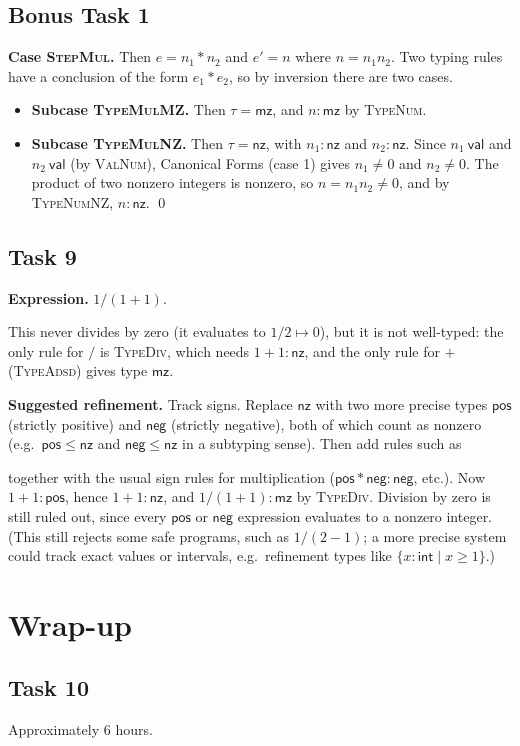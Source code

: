 \documentclass[11pt]{article}
\newcommand{\val}{\ \mathsf{val}}
\newcommand{\step}{\mapsto}
\newcommand{\kw}[1]{\mathsf{#1}}
\newcommand{\tint}{\kw{int}}
\newcommand{\nz}{\kw{nz}}
\newcommand{\mz}{\kw{mz}}
\newcommand{\rn}[1]{\textsc{#1}}
\newenvironment{task}[1]{\subsection*{#1}}{}
\begin{document}
\begin{task}{Bonus Task 1}
\textbf{Case \rn{StepMul}.} Then $e = n_1 * n_2$ and $e' = n$ where $n = n_1 n_2$.
Two typing rules have a conclusion of the form $e_1 * e_2$, so by inversion there are two cases.
\begin{itemize}[leftmargin=*]
\item \textbf{Subcase \rn{TypeMulMZ}.} Then $\tau = \mz$, and $n : \mz$ by \rn{TypeNum}.
\item \textbf{Subcase \rn{TypeMulNZ}.} Then $\tau = \nz$, with $n_1 : \nz$ and $n_2 : \nz$.
  Since $n_1 \val$ and $n_2 \val$ (by \rn{ValNum}), Canonical Forms (case 1) gives
  $n_1 \neq 0$ and $n_2 \neq 0$. The product of two nonzero integers is nonzero, so
  $n = n_1 n_2 \neq 0$, and by \rn{TypeNumNZ}, $n : \nz$. \qed
\end{itemize}
\end{task}

\begin{task}{Task 9}
\textbf{Expression.} $1 / (1 + 1)$.

This never divides by zero (it evaluates to $1/2 \step 0$), but it is not well-typed: the
only rule for $/$ is \rn{TypeDiv}, which needs $1 + 1 : \nz$, and the only rule for $+$
(\rn{TypeAdsd}) gives type $\mz$.

\textbf{Suggested refinement.} Track signs. Replace $\nz$ with two more precise types
$\kw{pos}$ (strictly positive) and $\kw{neg}$ (strictly negative), both of which count as
nonzero (e.g.\ $\kw{pos} \le \nz$ and $\kw{neg} \le \nz$ in a subtyping sense). Then add
rules such as
together with the usual sign rules for multiplication
($\kw{pos}*\kw{neg} : \kw{neg}$, etc.). Now $1 + 1 : \kw{pos}$, hence $1 + 1 : \nz$, and
$1/(1+1) : \mz$ by \rn{TypeDiv}. Division by zero is still ruled out, since every
$\kw{pos}$ or $\kw{neg}$ expression evaluates to a nonzero integer. (This still rejects
some safe programs, such as $1/(2-1)$; a more precise system could track exact values or
intervals, e.g.\ refinement types like $\{x : \tint \mid x \geq 1\}$.)
\end{task}

\section*{Wrap-up}

\begin{task}{Task 10}
Approximately 6 hours.
\end{task}
\end{document}
